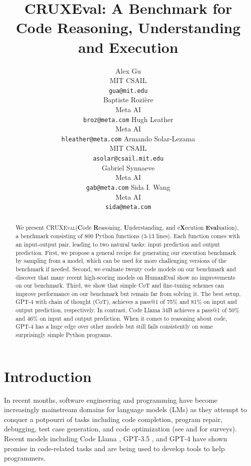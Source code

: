 \documentclass{article} %
\title{CRUXEval: A Benchmark for Code Reasoning, Understanding and Execution}
\author{Alex Gu \\
MIT CSAIL\\
\texttt{gua@mit.edu} \\
\And
Baptiste Rozière \\
Meta AI \\
\texttt{broz@meta.com}
\And
Hugh Leather \\
Meta AI \\
\texttt{hleather@meta.com}
\And
Armando Solar-Lezama \\
MIT CSAIL \\
\texttt{asolar@csail.mit.edu} \\
\And
Gabriel Synnaeve \\
Meta AI\\
\texttt{gab@meta.com}
\And
Sida I. Wang \\
Meta AI \\
\texttt{sida@meta.com} \\
}
\newcommand{\benchmark}{\textsc{CRUXEval}\xspace}
\begin{document}


\maketitle

\begin{abstract}
We present \benchmark (\textbf{C}ode \textbf{R}easoning, \textbf{U}nderstanding, and e\textbf{X}ecution \textbf{Eval}uation), a benchmark consisting of 800 Python functions (3-13 lines). Each function comes with an input-output pair, leading to two natural tasks: input prediction and output prediction. First, we propose a general recipe for generating our execution benchmark by sampling from a model, which can be used for more challenging versions of the benchmark if needed. Second, we evaluate twenty code models on our benchmark and discover that many recent high-scoring models on HumanEval show no improvements on our benchmark. Third, we show that simple CoT and fine-tuning schemes can improve performance on our benchmark but remain far from solving it. The best setup, GPT-4 with chain of thought (CoT), achieves a pass@1 of 75\% and 81\% on input and output prediction, respectively. In contrast, Code Llama 34B achieves a pass@1 of 50\% and 46\% on input and output prediction. When it comes to reasoning about code, GPT-4 has a huge edge over other models but still fails consistently on some surprisingly simple Python programs.
\end{abstract}

\section{Introduction} \label{sec:introduction}
In recent months, software engineering and programming have become increasingly mainstream domains for language models (LMs) as they attempt to conquer a potpourri of tasks including code completion, program repair, debugging, test case generation, and code optimization (see \citet{zan2023large} and \citet{fan2023large} for surveys). Recent models including Code Llama \citep{roziere2023code}, GPT-3.5 \citep{brown2020language, ouyang2022training}, and GPT-4 \citep{openai2023gpt} have shown promise in code-related tasks and are being used to develop tools to help programmers.
\end{document}
